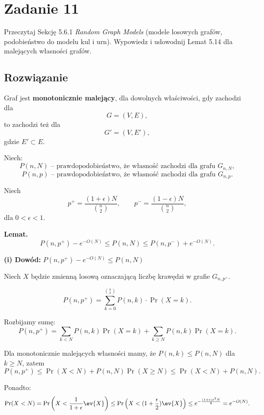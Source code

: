 \section{Zadanie 11}
Przeczytaj Sekcję 5.6.1 \textit{Random Graph Models} (modele losowych grafów,
podobieństwo do modelu kul i urn). Wypowiedz i udowodnij Lemat 5.14 dla
malejących własności grafów.

\subsection*{Rozwiązanie}
Graf jest \textbf{monotonicznie malejący},
dla dowolnych właściwości, gdy zachodzi dla
\[
	G = (V, E),
\]
to zachodzi też dla
\[
	G' = (V, E'),
\]
gdzie \(E' \subset E\).

\medskip

Niech:
\[
	P(n, N) \text{ -- prawdopodobieństwo, że własność zachodzi dla grafu } G_{n, N},
\]
\[
	P(n, p) \text{ -- prawdopodobieństwo, że własność zachodzi dla grafu } G_{n, p}.
\]

\medskip

Niech
\[
	p^{+} = \frac{(1+\epsilon)N}{\binom{n}{2}},
	\qquad
	p^{-} = \frac{(1-\epsilon)N}{\binom{n}{2}},
\]
dla \(0 < \epsilon < 1\).

\medskip

\textbf{Lemat.}
\[
	P(n, p^{+}) - e^{-O(N)} \le P(n, N) \le P(n, p^{-}) + e^{-O(N)}.
\]

\medskip

\textbf{(i) Dowód:} \(P(n, p^{+}) - e^{-O(N)} \le P(n, N)\)

\medskip

Niech \(X\) będzie zmienną losową oznaczającą liczbę krawędzi w grafie \(G_{n, p^{+}}\).

\[
	P(n, p^{+}) = \sum_{k=0}^{\binom{n}{2}} P(n, k) \cdot \Pr(X = k).
\]

Rozbijamy sumę:
\[
	P(n, p^{+}) = \sum_{k<N} P(n, k)\Pr(X=k) + \sum_{k \ge N} P(n, k)\Pr(X=k).
\]

Dla monotonicznie malejących własności mamy, że \(P(n, k) \le P(n, N)\) dla \(k \ge N\), zatem
\[
	P(n, p^{+}) \le \Pr(X < N) + P(n, N)\Pr(X \ge N) \le \Pr(X < N) + P(n, N).
\]

Ponadto:
\[
	\Pr(X < N) = \Pr\left(X < \frac{1}{1+\epsilon} \ev{X}\right)
	\le \Pr\left(X < (1 +\frac{\epsilon}{2}) \ev{X}\right)
	\le e^{-\frac{(1+\epsilon)\epsilon^2 N}{8}} = e^{-O(N)}.
\]

